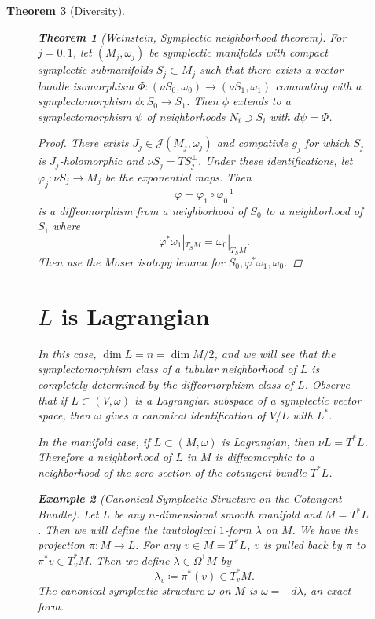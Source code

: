 \documentclass[leqno, openany]{memoir}
\newtheorem{thm}{Theorem}[chapter]
\theoremstyle{definition}
\newtheorem{exm}[thm]{Example}
\theoremstyle{remark}
\theoremstyle{plain}
\theoremstyle{definition}
\theoremstyle{remark}
\newcommand{\mc}[1]{\mathcal{#1}}
\begin{document}
\begin{thm}[Diversity]
\begin{figure}[H]
    \begin{thm}[Weinstein, Symplectic neighborhood theorem] For $j = 0,1$, let
        $(M_j, \omega_j)$ be symplectic manifolds with compact symplectic
        submanifolds $S_j \subset M_j$ such that there exists a vector bundle
        isomorphism $\Phi: (\nu S_0, \omega_0) \to (\nu S_1, \omega_1)$
        commuting with a symplectomorphism $\phi: S_0 \to S_1$. Then $\phi$
        extends to a symplectomorphism $\psi$ of neighborhoods $N_i \supset
        S_i$ with $d \psi = \Phi$.  \end{thm}

    \begin{proof} There exists $J_j \in \mc{J}(M_j, \omega_j)$ and compativle
        $g_j$ for which $S_j$ is $J_j$-holomorphic and $\nu S_j =
        TS_j^{\perp}$. Under these identifications, let $\varphi_j: \nu S_j \to
        M_j$ be the exponential maps. Then \[\varphi = \varphi_1
            \circ\varphi_0^{-1}\] is a diffeomorphism from a neighborhood of
            $S_0$ to a neighborhood of $S_1$ where \[ \varphi^* \omega_1 |_{T_S
            M} = \omega_0 |_{T_S M}. \] Then use the Moser isotopy lemma for
            $S_0, \varphi^* \omega_1, \omega_0$.  \end{proof}

    \section{$L$ is Lagrangian}%

    In this case, $\dim L = n = \dim M / 2$, and we will see that the
    symplectomorphism class of a tubular neighborhood of $L$ is completely
    determined by the diffeomorphism class of $L$. Observe that if $L \subset
    (V, \omega)$ is a Lagrangian subspace of a symplectic vector space, then
    $\omega$ gives a canonical identification of $V/L$ with $L^*$.

    In the manifold case, if $L \subset (M, \omega)$ is Lagrangian, then $\nu L
    = T^* L$. Therefore a neighborhood of $L$ in $M$ is diffeomorphic to a
    neighborhood of the zero-section of the cotangent bundle $T^*L$.

    \begin{exm}[Canonical Symplectic Structure on the Cotangent Bundle] Let $L$
        be any $n$-dimensional smooth manifold and $M = T^*L$. Then we will
        define the \textit{tautological $1$-form} $\lambda$ on $M$. We have the
        projection $\pi: M \to L$. For any $v \in M = T^* L$, $v$ is pulled
        back by $\pi$ to $\pi^* v \in T^*_v M$. Then we define $\lambda \in
        \Omega^1 M$ by \[ \lambda_v \coloneqq \pi^*(v) \in T^*_v M. \] The
        canonical symplectic structure $\omega$ on $M$ is $\omega = -d
        \lambda$, an exact form.


\end{exm}
\end{figure}
\end{thm}
\end{document}

